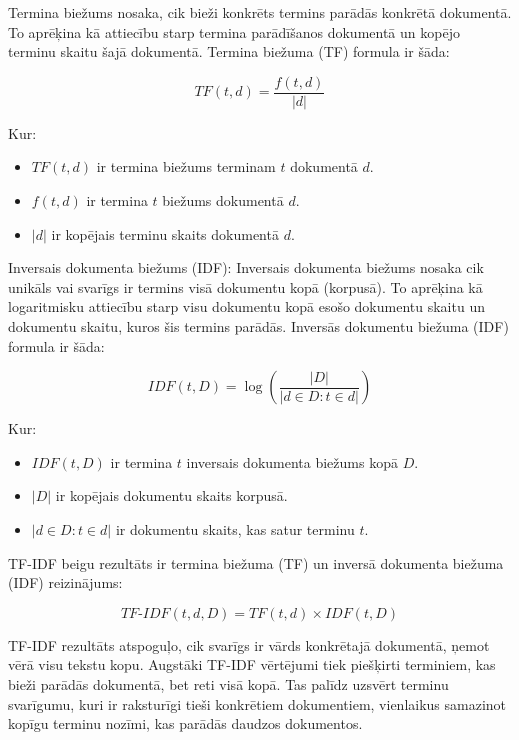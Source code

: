 Termina biežums nosaka, cik bieži konkrēts termins parādās konkrētā dokumentā. To aprēķina kā attiecību starp termina parādīšanos dokumentā un kopējo terminu skaitu šajā dokumentā. Termina biežuma (TF) formula ir šāda:

\begin{equation}
TF(t, d) = \frac{f(t, d)}{|d|}
\end{equation}

\noindent Kur:
\begin{itemize}
\item \(TF(t, d)\) ir termina biežums terminam \(t\) dokumentā \(d\).
\item \(f(t, d)\) ir termina \(t\) biežums dokumentā \(d\).
\item \(|d|\) ir kopējais terminu skaits dokumentā \(d\).
\end{itemize}

Inversais dokumenta biežums (IDF):
Inversais dokumenta biežums nosaka cik unikāls vai svarīgs ir termins visā dokumentu kopā (korpusā). To aprēķina kā logaritmisku attiecību starp visu dokumentu kopā esošo dokumentu skaitu un dokumentu skaitu, kuros šis termins parādās. Inversās dokumentu biežuma (IDF) formula ir šāda:

\begin{equation}
IDF(t, D) = \log\left(\frac{|D|}{|{d \in D : t \in d}|}\right)
\end{equation}

\noindent Kur:
\begin{itemize}
\item \(IDF(t, D)\) ir termina \(t\) inversais dokumenta biežums kopā \(D\).
\item \(|D|\) ir kopējais dokumentu skaits korpusā.
\item \(|{d \in D : t \in d}|\) ir dokumentu skaits, kas satur terminu \(t\).
\end{itemize}

TF-IDF beigu rezultāts ir termina biežuma (TF) un inversā dokumenta biežuma (IDF) reizinājums:

\begin{equation}
TF\text{-}IDF(t, d, D) = TF(t, d) \times IDF(t, D)
\end{equation}

TF-IDF rezultāts atspoguļo, cik svarīgs ir vārds konkrētajā dokumentā, ņemot vērā visu tekstu kopu. Augstāki TF-IDF vērtējumi tiek piešķirti terminiem, kas bieži parādās dokumentā, bet reti visā kopā. Tas palīdz uzsvērt terminu svarīgumu, kuri ir raksturīgi tieši konkrētiem dokumentiem, vienlaikus samazinot kopīgu terminu nozīmi, kas parādās daudzos dokumentos.

